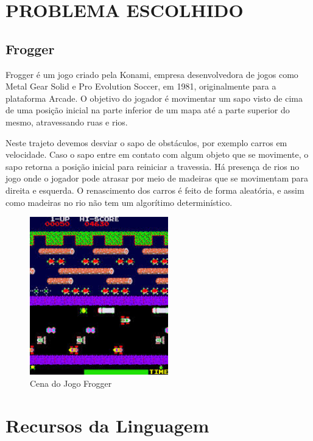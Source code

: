 \documentclass[rel-mlp]{iiufrgs}
\begin{document}
%
\chapter{PROBLEMA ESCOLHIDO}


\section{Frogger}

  Frogger é um jogo criado pela Konami, empresa desenvolvedora de jogos como Metal Gear Solid e Pro Evolution Soccer, em 1981, originalmente para a plataforma Arcade. O objetivo do jogador é movimentar um sapo visto de cima de uma posição inicial na parte inferior de um mapa até a parte superior do mesmo, atravessando ruas e rios.
  
  Neste trajeto devemos desviar o sapo de obstáculos, por exemplo carros em velocidade. Caso o sapo entre em contato com algum objeto que se movimente, o sapo retorna a posição inicial para reiniciar a travessia. Há presença de rios no jogo onde o jogador pode atrasar por meio de madeiras que se movimentam para direita e esquerda. O renascimento dos carros é feito de forma aleatória, e assim como madeiras no rio não tem um algorítimo determinístico.
  
    \begin{figure}
    \centering
    \includegraphics[width=6cm]{images/frogger.jpg}
    \caption{Cena do Jogo Frogger}
    \end{figure}


% 
\chapter{Recursos da Linguagem}
\end{document}
